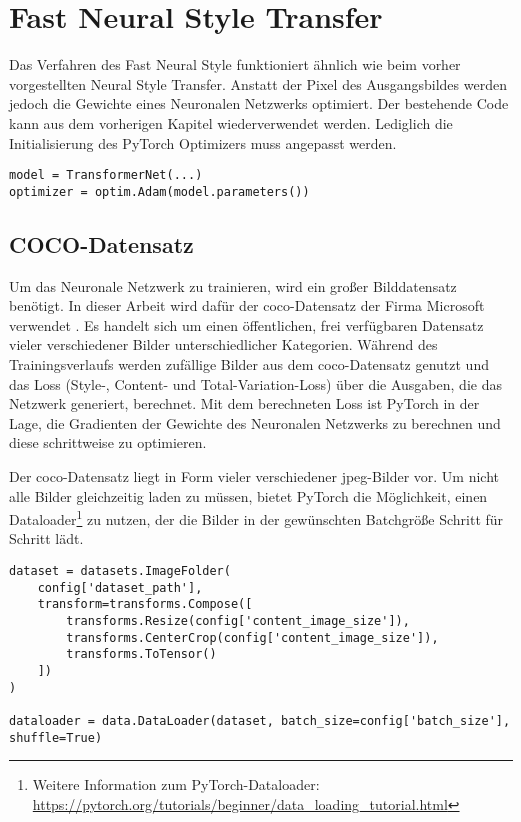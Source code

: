 \section{Fast Neural Style Transfer}

Das Verfahren des Fast Neural Style funktioniert ähnlich wie beim vorher vorgestellten Neural Style Transfer. Anstatt der Pixel des Ausgangsbildes werden jedoch die Gewichte eines Neuronalen Netzwerks optimiert. Der bestehende Code kann aus  dem vorherigen Kapitel wiederverwendet werden. Lediglich die Initialisierung des PyTorch Optimizers muss angepasst werden.

\begin{listing}[H]
\begin{verbatim}
model = TransformerNet(...)
optimizer = optim.Adam(model.parameters())
\end{verbatim}
\end{listing}

\subsection{COCO-Datensatz}

Um das Neuronale Netzwerk zu trainieren, wird ein großer Bilddatensatz benötigt. In dieser Arbeit wird dafür der \gls{coco}-Datensatz der Firma Microsoft verwendet \cite{DBLP:journals/corr/LinMBHPRDZ14}. Es handelt sich um einen öffentlichen, frei verfügbaren Datensatz vieler verschiedener Bilder unterschiedlicher Kategorien. Während des Trainingsverlaufs werden zufällige Bilder aus dem \gls{coco}-Datensatz genutzt und das Loss  (Style-, Content- und Total-Variation-Loss) über die Ausgaben, die das Netzwerk generiert, berechnet. Mit dem berechneten Loss ist PyTorch in der Lage, die Gradienten der Gewichte des Neuronalen Netzwerks zu berechnen und diese schrittweise zu optimieren.

Der \gls{coco}-Datensatz liegt in Form vieler verschiedener \gls{jpeg}-Bilder vor. Um nicht alle Bilder gleichzeitig laden zu müssen, bietet PyTorch die Möglichkeit, einen Dataloader\footnote{Weitere Information zum PyTorch-Dataloader: \url{https://pytorch.org/tutorials/beginner/data_loading_tutorial.html}} zu nutzen, der die Bilder in der gewünschten Batchgröße Schritt für Schritt lädt.

\begin{listing}[H]
\begin{verbatim}
dataset = datasets.ImageFolder(
    config['dataset_path'],
    transform=transforms.Compose([
        transforms.Resize(config['content_image_size']),
        transforms.CenterCrop(config['content_image_size']),
        transforms.ToTensor()
    ])
)

dataloader = data.DataLoader(dataset, batch_size=config['batch_size'], shuffle=True)
\end{verbatim}
\end{listing}

